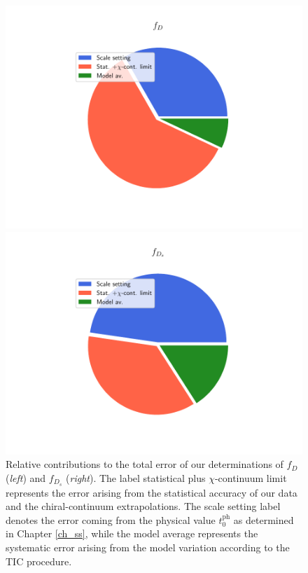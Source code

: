 \begin{figure}
\begin{center}
\begin{minipage}{.40\linewidth}
\includegraphics[width=\linewidth]{././cap6/figs/fds/error_pie_fd.pdf}
\end{minipage}
\hspace{10mm}
\begin{minipage}{.39\linewidth}
\includegraphics[width=\linewidth]{././cap6/figs/fds/error_pie_fds.pdf}
\end{minipage}
\end{center}
\vspace{-5mm}
	\caption{Relative contributions to the total error of our determinations of $f_D$ (\textit{left}) and $f_{D_s}$ (\textit{right}). The label statistical plus $\chi$-continuum limit represents the error arising from the statistical accuracy of our data and the chiral-continuum extrapolations. The scale setting label denotes the error coming from the physical value $t_0^{\mathrm{ph}}$ as determined in Chapter \ref{ch_ss}, while the model average represents the systematic error arising from the model variation according to the TIC procedure.	}
	\label{fig:fds_error_sources}
\end{figure}



